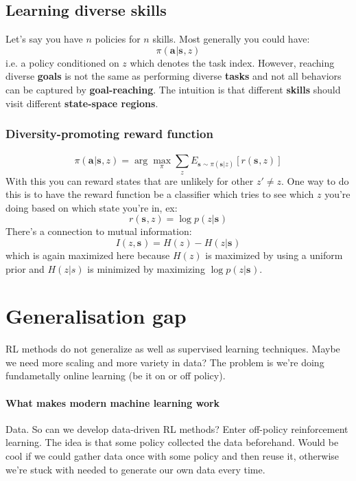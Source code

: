 \documentclass{report}
\newcommand{\argmax}{\arg\!\max}
\begin{document}
\section{Learning diverse skills}
Let's say you have $n$ policies for $n$ skills.
Most generally you could have:
\begin{equation}
		\pi(\bm{a}_{}|\bm{s}_{},z)
\end{equation}
i.e. a policy conditioned on $z$ which denotes the task index.
However, reaching diverse \textbf{goals} is not the same as performing diverse \textbf{tasks}
and not all behaviors can be captured by \textbf{goal-reaching}.
The intuition is that different \textbf{skills} should visit different \textbf{state-space regions}.

\subsection{Diversity-promoting reward function}
\begin{equation}
		\pi(\bm{a}_{}|\bm{s}_{},z) = \argmax_\pi \sum_{z}^{} E_{\bm{s}_{} \sim \pi(\bm{s}_{}|z)} \left[ r(\bm{s}_{},z) \right] 
\end{equation}
With this you can reward states that are unlikely for other $ z' \neq z  $.
One way to do this is to have the reward function be a classifier which tries to see which $z$ you're doing
based on which state you're in, ex:
\begin{equation}
		r(\bm{s}_{}, z) = \log p(z|\bm{s}_{})
\end{equation}
There's a connection to mutual information:
\begin{equation}
		I(z, \bm{s}_{}) = H(z) - H(z|\bm{s}_{})
\end{equation}
which is again maximized here
because $H(z)$ is maximized by using a uniform prior and 
$H(z|s)$ is minimized by maximizing $\log p(z|\bm{s}_{})$.

\chapter{Generalisation gap}
RL methods do not generalize as well as supervised learning techniques.
Maybe we need more scaling and more variety in data?
The problem is we're doing fundametally online learning (be it on or off policy).
\subsubsection{What makes modern machine learning work}
Data.
So can we develop data-driven RL methods?
Enter off-policy reinforcement learning.
The idea is that some policy collected the data beforehand.
Would be cool if we could gather data once with some policy and then reuse it, otherwise we're stuck
with needed to generate our own data every time.
\end{document}
